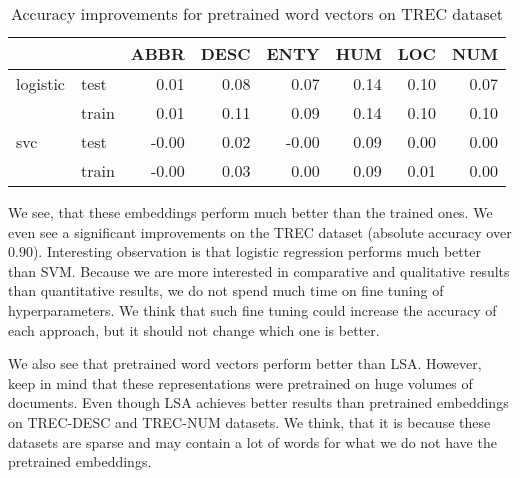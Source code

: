     
    \begin{table}[H]
    \begin{center}
    
    \begin{tabular}{llrrrrrr}
    \toprule
     &&ABBR &DESC &ENTY &HUM &LOC &NUM \\
    \midrule
    logistic & test &0.01 &0.08 &0.07 & 0.14 & 0.10 & 0.07 \\
     & train &0.01 &0.11 &0.09 & 0.14 & 0.10 & 0.10 \\
    svc & test & -0.00 &0.02 & -0.00 & 0.09 & 0.00 & 0.00 \\
     & train & -0.00 &0.03 &0.00 & 0.09 & 0.01 & 0.00 \\
    \bottomrule
    \end{tabular}
    
    \caption[Accuracy improvements for pretrained word vectors on TREC dataset]{Accuracy improvements for pretrained word vectors on TREC dataset}
    \label{tab:res:pretrainedwordvec:trec}
    \end{center}
    \end{table}

    
    We see, that these embeddings perform much better than the trained ones. 
    We even see a significant improvements on the TREC dataset (absolute accuracy over $0.90$).
    Interesting observation is that logistic regression performs much better than SVM.
    Because we are more interested in comparative and qualitative results than quantitative results, we do not spend much time on fine tuning of hyperparameters. We think that such fine tuning could increase the accuracy of each approach, but it should not change which one is better. 
    
    We also see that pretrained word vectors perform better than LSA. 
    However, keep in mind that these representations were pretrained on huge volumes of documents.
    Even though LSA achieves better results than pretrained embeddings on TREC-DESC and TREC-NUM datasets.
    We think, that it is because these datasets are sparse and may contain a lot of words for what we do not have the pretrained embeddings.
    
